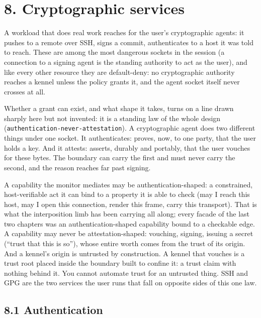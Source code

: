 \hypertarget{cryptographic-services}{%
\chapter{8. Cryptographic services}\label{cryptographic-services}}

A workload that does real work reaches for the user's cryptographic
agents: it pushes to a remote over SSH, signs a commit, authenticates to
a host it was told to reach. These are among the most dangerous sockets
in the session (a connection to a signing agent is the standing
authority to act as the user), and like every other resource they are
default-deny: no cryptographic authority reaches a kennel unless the
policy grants it, and the agent socket itself never crosses at all.

Whether a grant can exist, and what shape it takes, turns on a line
drawn sharply here but not invented: it is a standing law of the whole
design (\texttt{authentication-never-attestation}). A cryptographic
agent does two different things under one socket. It authenticates:
proves, now, to one party, that the user holds a key. And it attests:
asserts, durably and portably, that the user vouches for these bytes.
The boundary can carry the first and must never carry the second, and
the reason reaches far past signing.

A capability the monitor mediates may be authentication-shaped: a
constrained, host-verifiable act it can bind to a property it is able to
check (may I reach this host, may I open this connection, render this
frame, carry this transport). That is what the interposition limb has
been carrying all along; every facade of the last two chapters was an
authentication-shaped capability bound to a checkable edge. A capability
may never be attestation-shaped: vouching, signing, issuing a secret
(``trust that this is so''), whose entire worth comes from the trust of
its origin. And a kennel's origin is untrusted by construction. A kennel
that vouches is a trust root placed inside the boundary built to confine
it: a trust claim with nothing behind it. You cannot automate trust for
an untrusted thing. SSH and GPG are the two services the user runs that
fall on opposite sides of this one law.

\hypertarget{authentication}{%
\section{8.1 Authentication}\label{authentication}}

